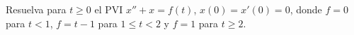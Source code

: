 Resuelva para $t\ge0$ el PVI $x''+x=f(t)$, $x(0)=x'(0)=0$, donde $f=0$ para $t<1$, $f=t-1$ para $1\le t<2$ y $f=1$ para $t\ge2$.
